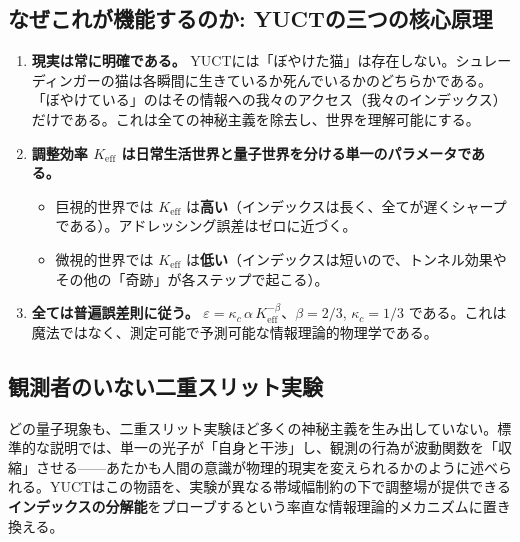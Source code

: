 \documentclass[12pt,a4paper]{article}
\theoremstyle{definition}
\theoremstyle{remark}
\begin{document}
	\subsection{なぜこれが機能するのか: YUCTの三つの核心原理}
	
	\begin{enumerate}[leftmargin=*]
		\item \textbf{現実は常に明確である。}
		YUCTには「ぼやけた猫」は存在しない。シュレーディンガーの猫は各瞬間に生きているか死んでいるかのどちらかである。「ぼやけている」のはその情報への我々のアクセス（我々のインデックス）だけである。これは全ての神秘主義を除去し、世界を理解可能にする。
		
		\item \textbf{調整効率 $K_{\mathrm{eff}}$ は日常生活世界と量子世界を分ける単一のパラメータである。}
		\begin{itemize}
			\item 巨視的世界では $K_{\mathrm{eff}}$ は\textbf{高い}（インデックスは長く、全てが遅くシャープである）。アドレッシング誤差はゼロに近づく。
			\item 微視的世界では $K_{\mathrm{eff}}$ は\textbf{低い}（インデックスは短いので、トンネル効果やその他の「奇跡」が各ステップで起こる）。
		\end{itemize}
		
		\item \textbf{全ては普遍誤差則に従う。}
		$ \varepsilon = \kappa_c \, \alpha \, K_{\mathrm{eff}}^{-\beta} $、$\beta = 2/3$, $\kappa_c = 1/3$ である。これは魔法ではなく、測定可能で予測可能な情報理論的物理学である。
	\end{enumerate}
	
	\medskip
	
	\subsection{観測者のいない二重スリット実験}
	
	どの量子現象も、二重スリット実験ほど多くの神秘主義を生み出していない。標準的な説明では、単一の光子が「自身と干渉」し、観測の行為が波動関数を「収縮」させる——あたかも人間の意識が物理的現実を変えられるかのように述べられる。YUCTはこの物語を、実験が異なる帯域幅制約の下で調整場が提供できる\textbf{インデックスの分解能}をプローブするという率直な情報理論的メカニズムに置き換える。
	
\end{document}
